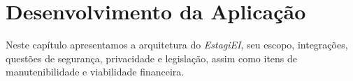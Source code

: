 \chapter{Desenvolvimento da Aplicação}
Neste capítulo apresentamos a arquitetura do \emph{EstagiEI}, seu escopo, integrações, questões de segurança, privacidade e legislação, assim como itens de manutenibilidade e viabilidade financeira.












